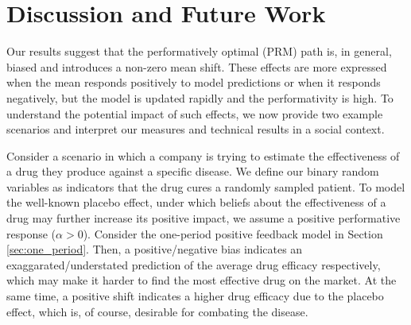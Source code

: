 \section{Discussion and Future Work}
\label{sec:conclusion}

%


Our results suggest that the performatively optimal (PRM) path is, in general, biased and introduces a non-zero mean shift. These effects are more expressed when the mean responds positively to model predictions or when it responds negatively, but the model is updated rapidly and the performativity is high. To understand the potential impact of such effects, we now provide two example scenarios and interpret our measures and technical results in a social context.

 Consider a scenario in which a company is trying to estimate the effectiveness of a drug they produce against a specific disease. We define our binary random variables as indicators that the drug cures a randomly sampled patient. To model the well-known placebo effect, under which beliefs about the effectiveness of a drug may further increase its positive impact, we assume a positive performative response ($\alpha > 0$). Consider the one-period positive feedback model in Section \ref{sec:one_period}. Then, a positive/negative bias indicates an exaggarated/understated prediction of the average drug efficacy respectively, which may make it harder to find the most effective drug on the market. At the same time, a positive shift indicates a higher drug efficacy due to the placebo effect, which is, of course, desirable for combating the disease.

